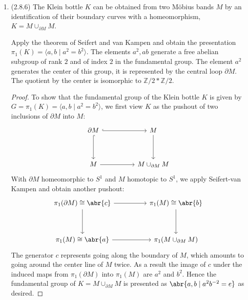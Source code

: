 \documentclass[11pt]{article}
\begin{document}
\begin{enumerate}
\begin{proof}
    \end{proof}
    \item (2.8.6) The Klein bottle $K$ can be obtained from two M\"obius bands $M$ by an identification of their boundary curves with a homeomorphism, $K = M\cup_{\partial M} M$. 
    
    Apply the theorem of Seifert and van Kampen and obtain the presentation $\pi_1(K) = \langle a,b\mid a^2 = b^2 \rangle$. The elements $a^2,ab$ generate a free abelian subgroup of rank $2$ and of index $2$ in the fundamental group. The element $a^2$ generates the center of this group, it is represented by the central loop $\partial M$. The quotient by the center is isomorphic to $\mathbb{Z}/2\ast \mathbb{Z}/2$. \begin{proof}
      To show that the fundamental group of the Klein bottle $K$ is given by $G = \pi_1(K) = \langle a,b\mid a^2 = b^2 \rangle$, we first view $K$ as the pushout of two inclusions of $\partial M$ into $M$: %
      \[\begin{tikzcd}
        {\partial M} && M \\
        \\
        M && {M\cup_{\partial M} M}
        \arrow[hook, from=1-1, to=1-3]
        \arrow[hook, from=1-1, to=3-1]
        \arrow[from=3-1, to=3-3]
        \arrow[from=1-3, to=3-3]
      \end{tikzcd}\] With $\partial M$ homeomorphic to $S^1$ and $M$ homotopic to $S^1$, we apply Seifert-van Kampen and obtain another pushout: %
      \[\begin{tikzcd}
        {\pi_1(\partial M)\cong \abr{c}} && {\pi_1(M)\cong \abr{b}} \\
        \\
        {\pi_1(M)\cong \abr{a}} && {\pi_1(M\cup_{\partial M} M)}
        \arrow[from=1-1, to=1-3]
        \arrow[from=1-1, to=3-1]
        \arrow[from=3-1, to=3-3]
        \arrow[from=1-3, to=3-3]
      \end{tikzcd}\] The generator $c$ represents going along the boundary of $M$, which amounts to going around the center line of $M$ twice. As a result the image of $c$ under the induced maps from $\pi_1(\partial M)$ into $\pi_1(M)$ are $a^2$ and $b^2$. Hence the fundamental group of $K = M\cup_{\partial M}M$ is presented as $\abr{a,b\mid a^2b^{-2} = e}$ as desired.


\end{proof}
\end{enumerate}
\end{document}
